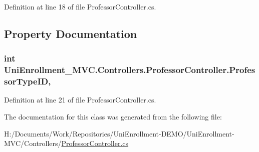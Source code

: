 Definition at line 18 of file Professor\+Controller.\+cs.



\subsection{Property Documentation}
\subsubsection[{\texorpdfstring{Professor\+Type\+ID}{ProfessorTypeID}}]{\setlength{\rightskip}{0pt plus 5cm}int Uni\+Enrollment\+\_\+\+M\+V\+C.\+Controllers.\+Professor\+Controller.\+Professor\+Type\+ID\hspace{0.3cm}{\ttfamily [get]}, {\ttfamily [protected]}}\hypertarget{class_uni_enrollment___m_v_c_1_1_controllers_1_1_professor_controller_ae95fa62ec0b4a85f1bbb3d2174359bdf}{}\label{class_uni_enrollment___m_v_c_1_1_controllers_1_1_professor_controller_ae95fa62ec0b4a85f1bbb3d2174359bdf}


Definition at line 21 of file Professor\+Controller.\+cs.



The documentation for this class was generated from the following file\+:\begin{DoxyCompactItemize}
\item 
H\+:/\+Documents/\+Work/\+Repositories/\+Uni\+Enrollment-\/\+D\+E\+M\+O/\+Uni\+Enrollment-\/\+M\+V\+C/\+Controllers/\hyperlink{_professor_controller_8cs}{Professor\+Controller.\+cs}\end{DoxyCompactItemize}

